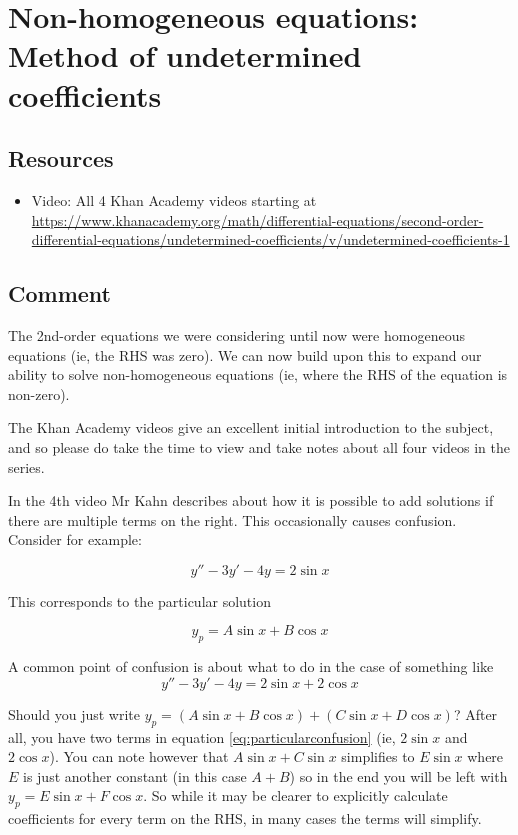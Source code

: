 \newpage
\section{Non-homogeneous equations: Method of undetermined coefficients}

\subsection*{Resources}
\begin{itemize}
    \item Video: All 4 Khan Academy videos starting at \url{https://www.khanacademy.org/math/differential-equations/second-order-differential-equations/undetermined-coefficients/v/undetermined-coefficients-1}
\end{itemize}

\subsection*{Comment}
The 2nd-order equations we were considering until now were homogeneous equations (ie, the RHS was zero). We can now build upon this to expand our ability to solve non-homogeneous equations (ie, where the RHS of the equation is non-zero).

The Khan Academy videos give an excellent initial introduction to the subject, and so please do take the time to view and take notes about all four videos in the series.

In the 4th video Mr Kahn describes about how it is possible to add solutions if there are multiple terms on the right. This occasionally causes confusion. Consider for example:

\begin{equation}
    y'' - 3y' - 4y = 2 \sin x
\end{equation}

This corresponds to the particular solution

\begin{equation}
    y_p = A \sin x + B \cos x
\end{equation}

A common point of confusion is about what to do in the case of something like
\begin{equation}
    \label{eq:particularconfusion}
    y'' - 3y' - 4y = 2 \sin x + 2 \cos x
\end{equation}

Should you just write $y_p = (A \sin x + B \cos x) + (C \sin x + D \cos x)$? After all, you have two terms in equation \ref{eq:particularconfusion} (ie, $2 \sin x$ and $2 \cos x$). You can note however that $A \sin x + C \sin x$ simplifies to $E \sin x$ where $E$ is just another constant (in this case $A+B$) so in the end you will be left with $y_p = E \sin x + F \cos x$. So while it may be clearer to explicitly calculate coefficients for every term on the RHS, in many cases the terms will simplify.


